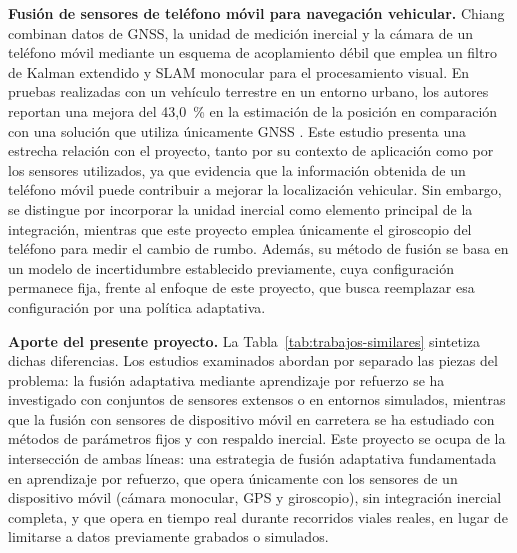 \textbf{Fusión de sensores de teléfono móvil para navegación vehicular.} Chiang \etal{} combinan datos de GNSS, la unidad de medición inercial y la cámara de un teléfono móvil mediante un esquema de acoplamiento débil que emplea un filtro de Kalman extendido y SLAM monocular para el procesamiento visual. En pruebas realizadas con un vehículo terrestre en un entorno urbano, los autores reportan una mejora del 43{,}0~\% en la estimación de la posición en comparación con una solución que utiliza únicamente GNSS \cite{chiang2020smartphone}.
Este estudio presenta una estrecha relación con el proyecto, tanto por su contexto de aplicación como por los sensores utilizados, ya que evidencia que la información obtenida de un teléfono móvil puede contribuir a mejorar la localización vehicular.
Sin embargo, se distingue por incorporar la unidad inercial como elemento principal de la integración, mientras que este proyecto emplea únicamente el giroscopio del teléfono para medir el cambio de rumbo.
Además, su método de fusión se basa en un modelo de incertidumbre establecido previamente, cuya configuración permanece fija, frente al enfoque de este proyecto, que busca reemplazar esa configuración por una política adaptativa.

 
\textbf{Aporte del presente proyecto.} La Tabla~\ref{tab:trabajos-similares} sintetiza dichas diferencias.
Los estudios examinados abordan por separado las piezas del problema: la fusión adaptativa mediante aprendizaje por refuerzo se ha investigado con conjuntos de sensores extensos o en entornos simulados, mientras que la fusión con sensores de dispositivo móvil en carretera se ha estudiado con métodos de parámetros fijos y con respaldo inercial.
Este proyecto se ocupa de la intersección de ambas líneas: una estrategia de fusión adaptativa fundamentada en aprendizaje por refuerzo, que opera únicamente con los sensores de un dispositivo móvil (cámara monocular, GPS y giroscopio), sin integración inercial completa, y que opera en tiempo real durante recorridos viales reales, en lugar de limitarse a datos previamente grabados o simulados.

